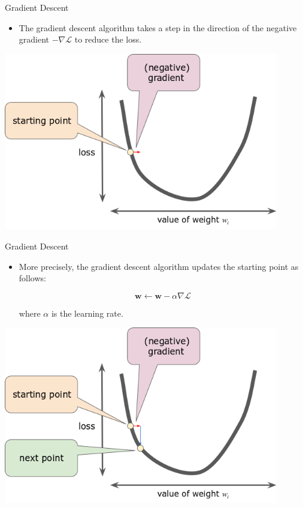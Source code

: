 \documentclass{beamer}
\begin{document}
\begin{frame}{Gradient Descent}
\begin{itemize}
\item The gradient descent algorithm takes a step in the direction of the negative gradient $-\nabla \mathcal{L}$ to reduce the loss.
\end{itemize}

\vspace{0.1cm}
\includegraphics[width=0.9\textwidth]{images/GradientDescentNegativeGradient.png}
\end{frame}


\begin{frame}{Gradient Descent}
\begin{itemize}
\item More precisely, the gradient descent algorithm updates the starting point as follows:

\vspace{-0.25cm}

$$ \boldsymbol{w} \leftarrow \boldsymbol{w} - \alpha \nabla\mathcal{L} $$

where $\alpha$ is the learning rate.
\end{itemize}
\includegraphics[width=0.9\textwidth]{images/GradientDescentGradientStep.png}
\end{frame}
\end{document}
